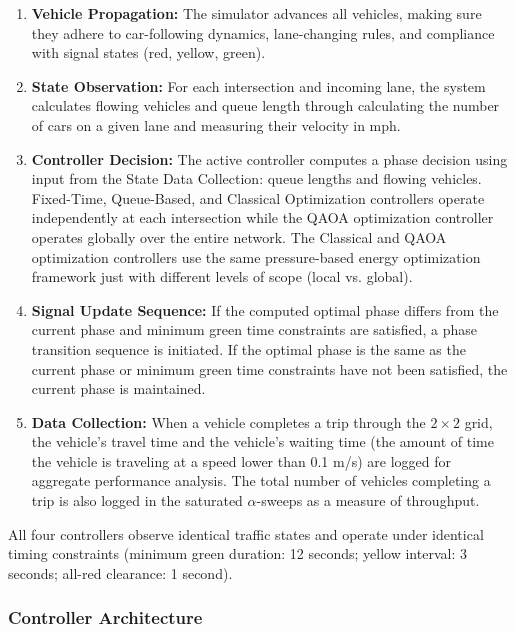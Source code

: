 \documentclass[12pt]{article}
\begin{document}
\begin{enumerate}
\item \textbf{Vehicle Propagation:} The simulator advances all vehicles, making sure they adhere to car-following dynamics, lane-changing rules, and compliance with signal states (red, yellow, green).

\item \textbf{State Observation:} For each intersection and incoming lane, the system calculates flowing vehicles and queue length through calculating the number of cars on a given lane and measuring their velocity in mph.

\item \textbf{Controller Decision:} The active controller computes a phase decision using input from the State Data Collection: queue lengths and flowing vehicles. Fixed-Time, Queue-Based, and Classical Optimization controllers operate independently at each intersection while the QAOA optimization controller operates globally over the entire network. The Classical and QAOA optimization controllers use the same pressure-based energy optimization framework just with different levels of scope (local vs. global).

\item \textbf{Signal Update Sequence:} If the computed optimal phase differs from the current phase and minimum green time constraints are satisfied, a phase transition sequence is initiated. If the optimal phase is the same as the current phase or minimum green time constraints have not been satisfied, the current phase is maintained.

\item \textbf{Data Collection:} When a vehicle completes a trip through the $2 \times 2$ grid, the vehicle's travel time and the vehicle's waiting time (the amount of time the vehicle is traveling at a speed lower than 0.1 m/s) are logged for aggregate performance analysis. The total number of vehicles completing a trip is also logged in the saturated $\alpha$-sweeps as a measure of throughput.

\end{enumerate}

All four controllers observe identical traffic states and operate under identical timing constraints (minimum green duration: 12 seconds; yellow interval: 3 seconds; all-red clearance: 1 second).

\subsubsection{Controller Architecture}
\end{document}
